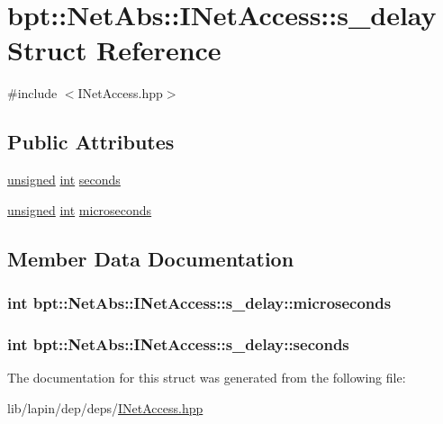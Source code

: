 \hypertarget{structbpt_1_1_net_abs_1_1_i_net_access_1_1s__delay}{\section{bpt\-:\-:Net\-Abs\-:\-:I\-Net\-Access\-:\-:s\-\_\-delay Struct Reference}
\label{structbpt_1_1_net_abs_1_1_i_net_access_1_1s__delay}
}


{\ttfamily \#include $<$I\-Net\-Access.\-hpp$>$}

\subsection*{Public Attributes}
\begin{DoxyCompactItemize}
\item 
\hyperlink{curses_8priv_8h_aca40206900cfc164654362fa8d4ad1e6}{unsigned} \hyperlink{term__entry_8h_ad65b480f8c8270356b45a9890f6499ae}{int} \hyperlink{structbpt_1_1_net_abs_1_1_i_net_access_1_1s__delay_ad1aeeb17d2610d527a519474627d770e}{seconds}
\item 
\hyperlink{curses_8priv_8h_aca40206900cfc164654362fa8d4ad1e6}{unsigned} \hyperlink{term__entry_8h_ad65b480f8c8270356b45a9890f6499ae}{int} \hyperlink{structbpt_1_1_net_abs_1_1_i_net_access_1_1s__delay_a82a92846da18ed504254b9749ae808f9}{microseconds}
\end{DoxyCompactItemize}


\subsection{Member Data Documentation}
\hypertarget{structbpt_1_1_net_abs_1_1_i_net_access_1_1s__delay_a82a92846da18ed504254b9749ae808f9}{
\subsubsection[{microseconds}]{ {\bf int} bpt\-::\-Net\-Abs\-::\-I\-Net\-Access\-::s\-\_\-delay\-::microseconds}}\label{structbpt_1_1_net_abs_1_1_i_net_access_1_1s__delay_a82a92846da18ed504254b9749ae808f9}
\hypertarget{structbpt_1_1_net_abs_1_1_i_net_access_1_1s__delay_ad1aeeb17d2610d527a519474627d770e}{
\subsubsection[{seconds}]{ {\bf int} bpt\-::\-Net\-Abs\-::\-I\-Net\-Access\-::s\-\_\-delay\-::seconds}}\label{structbpt_1_1_net_abs_1_1_i_net_access_1_1s__delay_ad1aeeb17d2610d527a519474627d770e}


The documentation for this struct was generated from the following file\-:\begin{DoxyCompactItemize}
\item 
lib/lapin/dep/deps/\hyperlink{_i_net_access_8hpp}{I\-Net\-Access.\-hpp}\end{DoxyCompactItemize}
